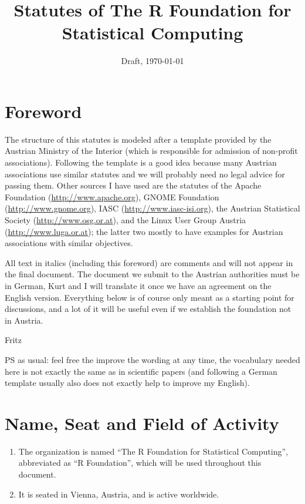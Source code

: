 \documentclass[a4paper]{article}
\title{\bf Statutes of The R Foundation for Statistical Computing}
\date{Draft, \today}
\begin{document}
\maketitle

\it

\section*{Foreword}

The structure of this statutes is modeled after a template provided by
the Austrian Ministry of the Interior (which is responsible for
admission of non-profit associations). Following the template is a
good idea because many Austrian associations use similar statutes and we
will probably need no legal advice for passing them. Other sources I
have used are the statutes of
the Apache Foundation (\url{http://www.apache.org}),
GNOME Foundation (\url{http://www.gnome.org}),
IASC (\url{http://www.iasc-isi.org}),
the Austrian Statistical Society (\url{http://www.osg.or.at}),
and the Linux User Group Austria (\url{http://www.luga.or.at});
the latter two mostly to have examples
for Austrian associations with similar objectives.

All text in italics (including this foreword) are comments and will
not appear in the final document. The document we submit to the
Austrian authorities must be in German, Kurt and I will translate it
once we have an agreement on the English version. Everything below is
of course only meant as a starting point for discussions, and a lot of
it will be useful even if we establish the foundation not in Austria.

\medskip\noindent
Fritz

\medskip\noindent
PS as usual: feel free the improve the wording at any time, the
vocabulary needed here is not exactly the same as in scientific
papers (and following a German template usually also does not exactly
help to improve my English).

\rm

\section{Name, Seat and Field of Activity}

\begin{enumerate}
 \item The organization is named ``The R Foundation for Statistical
  Computing'', abbreviated as ``R Foundation'', which will be used
  throughout this document.
 \item It is seated in Vienna, Austria, and is active worldwide.
\end{enumerate}
\end{document}
